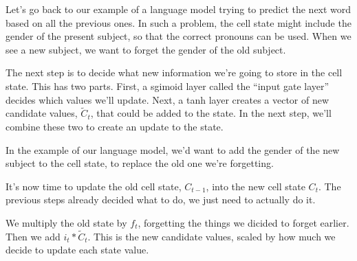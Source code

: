 \documentclass[12pt]{article} %
\begin{document}
Let's go back to our example of a language model trying to predict the next word based on all the previous ones. In such a problem, the cell state might include the gender of the present subject, so that the correct pronouns can be used. When we see a new subject, we want to forget the gender of the old subject.
\begin{figure}[H] %
\label{fig:rnnunrolled}
\end{figure}

The next step is to decide what new information we're going to store in the cell state. This has two parts. First, a sgimoid layer called the ``input gate layer'' decides which values we'll update. Next, a tanh layer creates a vector of new candidate values, $\tilde{C}_{t}$, that could be added to the state. In the next step, we'll combine these two to create an update to the state.

In the example of our language model, we'd want to add the gender of the new subject to the cell state, to replace the old one we're forgetting.

\begin{figure}[H] %
\label{fig:rnnunrolled}
\end{figure}

It's now time to update the old cell state, $C_{t-1}$, into the new cell state $C_{t}$. The previous steps already decided what to do, we just need to actually do it.

We multiply the old state by $f_{t}$, forgetting the things we dicided to forget earlier. Then we add $i_{t}*\tilde{C}_{t}$. This is the new candidate values, scaled by how much we decide to update each state value.
\end{document}
